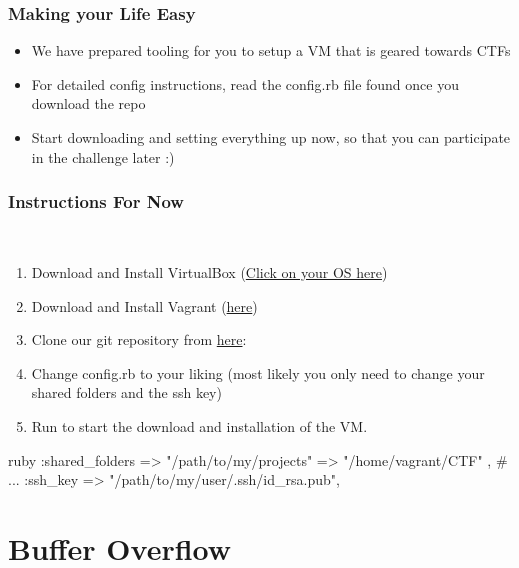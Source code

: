 \documentclass[aspectratio=169]{beamer}
\begin{document}
\begin{frame}
    \frametitle{Making your Life Easy}
    \begin{itemize}
        \item We have prepared tooling for you to setup a VM that is geared towards CTFs
        \item For detailed config instructions, read the config.rb file found once you download the repo
        \item Start downloading and setting everything up now, so that you can participate in the challenge later :)
    \end{itemize} 
\end{frame}

\begin{frame}[fragile]
    \frametitle{Instructions For Now}
     \begin{enumerate}
        \item Download and Install VirtualBox (\href{https://www.virtualbox.org/wiki/Download_Old_Builds_6_0}{Click on your OS here})
        \item Download and Install Vagrant (\href{https://www.vagrantup.com/downloads.html}{here})
        \item Clone our git repository from \href{https://gitlab.ethz.ch/vis/ctf/ctf-vm}{here}: 
        \item Change config.rb to your liking (most likely you only need to change your shared folders and the ssh key)
        \item Run  to start the download and installation of the VM.
    \end{enumerate}
            \begin{codebox}{ruby} 
:shared_folders => {
    "/path/to/my/projects" => "/home/vagrant/CTF"
},
# ...
:ssh_key => "/path/to/my/user/.ssh/id_rsa.pub",
\end{codebox}
\end{frame}

\section{Buffer Overflow}
\end{document}
